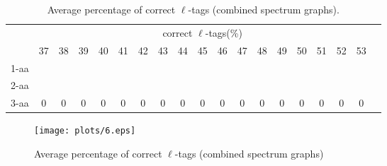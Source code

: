 \documentclass{article}
\begin{document}
\begin{landscape}
\begin{table}[h]
\vspace{3mm}
\end{table}
\begin{table}[h]\tiny
\vspace{3mm}
{\centering
\begin{center}
\begin{tabular}{|l|c|c|c|c|c|c|c|c|c|c|c|c|c|c|c|c|c|c|}
  \hline
  & \multicolumn{ 17 }{|c|}{correct $\ell$-tags(\%)} \\
  \cline{2- 18}
    & 37 & 38 & 39 & 40 & 41 & 42 & 43 & 44 & 45 & 46 & 47 & 48 & 49 & 50 & 51 & 52 & 53\\
  \hline
1-aa  &  &  &  &  &  &  &  &  &  &  &  &  &  &  &  &  & \\
2-aa  &  &  &  &  &  &  &  &  &  &  &  &  &  &  &  &  & \\
3-aa  & 0 & 0 & 0 & 0 & 0 & 0 & 0 & 0 & 0 & 0 & 0 & 0 & 0 & 0 & 0 & 0 & 0\\
 \hline
\end{tabular}
\end{center}
\par}
\centering

\caption{ Average percentage of correct $\ell$-tags (combined spectrum graphs).}
\label{table:table6}

\vspace{3mm}
\end{table}
\end{landscape}

\begin{figure}
  \begin{center}
\texttt{[image: plots/6.eps]}

\end{center}
\caption{Average percentage of correct $\ell$-tags (combined spectrum graphs)}
  \label{fig:LABEL}
\end{figure}
\end{document}
